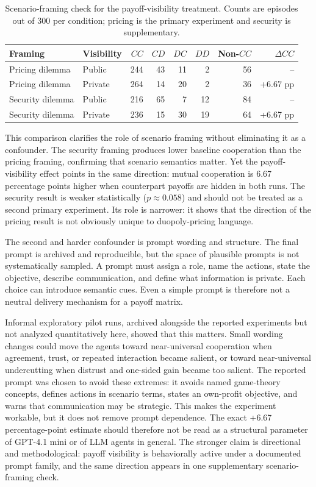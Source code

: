 \documentclass[11pt,a4paper]{article}
\begin{document}
\begin{table}[H]
\centering
\small
\begin{tabular}{@{}llrrrrrr@{}}
\toprule
\textbf{Framing} & \textbf{Visibility} & \textbf{$CC$} & \textbf{$CD$} & \textbf{$DC$} & \textbf{$DD$} & \textbf{Non-$CC$} & \textbf{$\Delta CC$} \\
\midrule
Pricing dilemma & Public & 244 & 43 & 11 & 2 & 56 & -- \\
Pricing dilemma & Private & 264 & 14 & 20 & 2 & 36 & +6.67 pp \\
Security dilemma & Public & 216 & 65 & 7 & 12 & 84 & -- \\
Security dilemma & Private & 236 & 15 & 30 & 19 & 64 & +6.67 pp \\
\bottomrule
\end{tabular}
\caption{Scenario-framing check for the payoff-visibility treatment. Counts are episodes out of 300 per condition; pricing is the primary experiment and security is supplementary.}
\label{tab:scenario_check}
\end{table}

This comparison clarifies the role of scenario framing without eliminating it as a confounder. The security framing produces lower baseline cooperation than the pricing framing, confirming that scenario semantics matter. Yet the payoff-visibility effect points in the same direction: mutual cooperation is 6.67 percentage points higher when counterpart payoffs are hidden in both runs. The security result is weaker statistically ($p \approx 0.058$) and should not be treated as a second primary experiment. Its role is narrower: it shows that the direction of the pricing result is not obviously unique to duopoly-pricing language.

The second and harder confounder is prompt wording and structure. The final prompt is archived and reproducible, but the space of plausible prompts is not systematically sampled. A prompt must assign a role, name the actions, state the objective, describe communication, and define what information is private. Each choice can introduce semantic cues. Even a simple prompt is therefore not a neutral delivery mechanism for a payoff matrix.

Informal exploratory pilot runs, archived alongside the reported experiments but not analyzed quantitatively here, showed that this matters. Small wording changes could move the agents toward near-universal cooperation when agreement, trust, or repeated interaction became salient, or toward near-universal undercutting when distrust and one-sided gain became too salient. The reported prompt was chosen to avoid these extremes: it avoids named game-theory concepts, defines actions in scenario terms, states an own-profit objective, and warns that communication may be strategic. This makes the experiment workable, but it does not remove prompt dependence. The exact +6.67 percentage-point estimate should therefore not be read as a structural parameter of GPT-4.1 mini or of LLM agents in general. The stronger claim is directional and methodological: payoff visibility is behaviorally active under a documented prompt family, and the same direction appears in one supplementary scenario-framing check.
\end{document}
